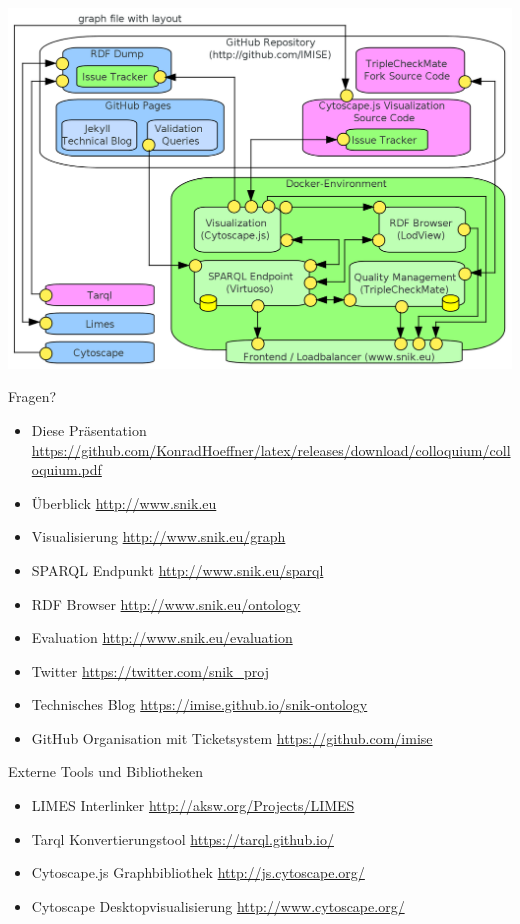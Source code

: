 \documentclass{beamer}
\begin{document}
\begin{frame}
\includegraphics[width=\textwidth]{img/architecture.png}
\end{frame}

\begin{frame}[fragile]{Fragen?}
\begin{itemize}
\item Diese Präsentation \url{https://github.com/KonradHoeffner/latex/releases/download/colloquium/colloquium.pdf}
\vspace{0.5em}%
\item Überblick \url{http://www.snik.eu}
\item Visualisierung \url{http://www.snik.eu/graph}
\item SPARQL Endpunkt \url{http://www.snik.eu/sparql}
\item RDF Browser \url{http://www.snik.eu/ontology}
\item Evaluation \url{http://www.snik.eu/evaluation}
\item Twitter \url{https://twitter.com/snik\_proj}
\item Technisches Blog \url{https://imise.github.io/snik-ontology}
\item GitHub Organisation mit Ticketsystem \url{https://github.com/imise}
\end{itemize}
\end{frame}

\begin{frame}[fragile]{Externe Tools und Bibliotheken}
\begin{itemize}
\item LIMES Interlinker \url{http://aksw.org/Projects/LIMES}
\item Tarql Konvertierungstool \url{https://tarql.github.io/}
\item Cytoscape.js Graphbibliothek \url{http://js.cytoscape.org/}
\item Cytoscape Desktopvisualisierung \url{http://www.cytoscape.org/}
\end{itemize}
\end{frame}
 
\end{document}
